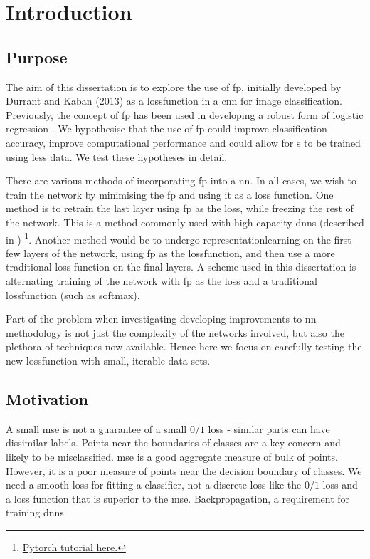 \chapter{Introduction}

\section{Purpose}

The aim of this dissertation is to explore the use of  \gls{fp}, initially developed by Durrant and Kaban (2013)\cite{durrant2013sharp} as a \gls{lossfunction} in a \gls{cnn} for image classification. Previously, the concept of  \gls{fp} has been used in developing a robust form of logistic regression \cite{label_noise}. We hypothesise that the use of  \gls{fp} could improve classification accuracy, improve computational performance and could allow for s to be trained using less data. We test these hypotheses in detail. 
\bigskip

There are various methods of incorporating  \gls{fp} into a  \gls{nn}. In all cases, we wish to train the network by minimising the \gls{fp} and using it as a loss function. One method is to retrain the last layer using  \gls{fp} as the loss, while freezing the rest of the network. This is a method commonly used with high capacity \gls{dnn}s (described in \cite{transfer_learning}) \footnote{\href{https://pytorch.org/tutorials/beginner/transfer_learning_tutorial.html}{Pytorch tutorial here.}}. Another method would be to undergo \gls{representationlearning} on the first few \gls{layer}s of the network, using \gls{fp} as the \gls{lossfunction}, and then use a more traditional loss function on the final layers. A scheme used in this dissertation is alternating training of the network with  \gls{fp} as the \gls{loss} and a traditional \gls{lossfunction} (such as \gls{softmax}). 
\bigskip

Part of the problem when investigating developing improvements to \gls{nn} methodology is not just the complexity of the networks involved, but also the plethora of techniques now available. Hence here we focus on carefully testing the new \gls{lossfunction} with small, iterable data sets.
\bigskip

\section{Motivation}

A small  \gls{mse} is not a guarantee of a small $0/1$ loss - similar parts can have dissimilar labels. Points near the boundaries of classes are a key concern and likely to be misclassified.  \gls{mse} is a good aggregate measure of bulk of points. However, it is a poor measure of points near the decision boundary of classes. We need a smooth loss for fitting a classifier, not a discrete loss like the $0/1$ loss and a loss function that is superior to the  \gls{mse}. Backpropagation, a requirement for training \gls{dnn}s
\bigskip

